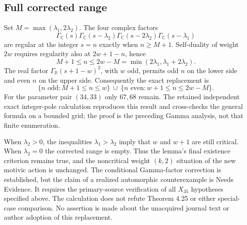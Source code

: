 \documentclass[10pt]{article}
\begin{document}
\subsection*{Full corrected range}
Set \(M=\max(\lambda_1,2\lambda_2)\). The four complex factors \[\Gamma_{\mathbb C}(s)\Gamma_{\mathbb C}(s-\lambda_2)
 \Gamma_{\mathbb C}(s-2\lambda_2)\Gamma_{\mathbb C}(s-\lambda_1)\] are regular at the integer \(s=n\) exactly when \(n\ge M+1\). Self-duality of weight \(2w\) requires regularity also at \(2w+1-n\), hence \[M+1\le n\le 2w-M=\min(2\lambda_1,\lambda_1+2\lambda_2).\] The real factor \(\Gamma_{\mathbb R}(s+1-w)^2\), with \(w\) odd, permits odd \(n\) on the lower side and even \(n\) on the upper side. Consequently the exact replacement is \[\boxed{\;
 \{n\text{ odd}:M+1\le n\le w\}
 \ \cup\
 \{n\text{ even}:w+1\le n\le2w-M\}.
 \;}\] For the parameter pair \((34,33)\) only \(67,68\) remain. The retained independent exact integer-pole calculation reproduces this result and cross-checks the general formula on a bounded grid; the proof is the preceding Gamma analysis, not that finite enumeration.\par
When \(\lambda_2>0\), the inequalities \(\lambda_1>\lambda_2\) imply that \(w\) and \(w+1\) are still critical. When \(\lambda_2=0\) the corrected range is empty. Thus the lemma’s final existence criterion remains true, and the noncritical weight \((k,2)\) situation of the new motivic action is unchanged. The conditional Gamma-factor correction is established, but the claim of a realized automorphic counterexample is Needs Evidence. It requires the primary-source verification of all \(X_{35}\) hypotheses specified above. The calculation does not refute Theorem 4.25 or either special-case comparison. No assertion is made about the unacquired journal text or author adoption of this replacement.\par
\end{document}
